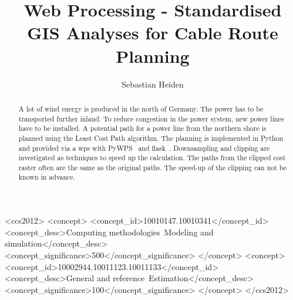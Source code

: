 \documentclass[acmtog]{acmart}
\begin{document}
	\title{Web Processing - Standardised GIS Analyses for Cable Route Planning}
	
	\author{Sebastian Heiden}
	
	
	\renewcommand{\shortauthors}{Heiden}
	
	\begin{abstract}
		A lot of wind energy is produced in the north of Germany. The power has to be transported further inland. To reduce congestion in the power system, new power lines have to be installed.
		A potential path for a power line from the northern shore is planned using the Least Cost Path algorithm.
		The planning is implemented in Python and provided via a \acrfull{wps} with PyWPS~\cite{noauthor_welcome_2016} and flask~\cite{noauthor_flask_nodate}.
		Downsampling and clipping are investigated as techniques to speed up the calculation.
		The paths from the clipped cost raster often are the same as the original paths.
		The speed-up of the clipping can not be known in advance.
	\end{abstract}
	
	\begin{CCSXML}
		<ccs2012>
		<concept>
		<concept_id>10010147.10010341</concept_id>
		<concept_desc>Computing methodologies~Modeling and simulation</concept_desc>
		<concept_significance>500</concept_significance>
		</concept>
		<concept>
		<concept_id>10002944.10011123.10011133</concept_id>
		<concept_desc>General and reference~Estimation</concept_desc>
		<concept_significance>100</concept_significance>
		</concept>
		</ccs2012>
	\end{CCSXML}
	


	
	
	
\end{document}
